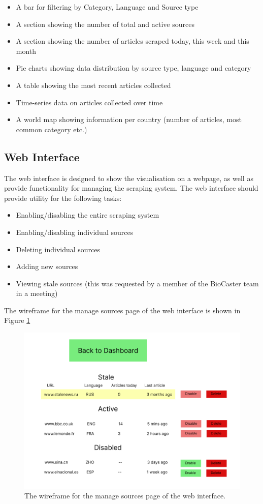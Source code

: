 \documentclass{l4proj}
\begin{document}
\begin{itemize}
    \item A bar for filtering by Category, Language and Source type
    \item A section showing the number of total and active sources
    \item A section showing the number of articles scraped today, this week and this month
    \item Pie charts showing data distribution by source type, language and category
    \item A table showing the most recent articles collected
    \item Time-series data on articles collected over time
    \item A world map showing information per country (number of articles, most common category etc.)
\end{itemize}

\subsection{Web Interface}
The web interface is designed to show the visualisation on a webpage, as well as provide functionality for managing the scraping system. The web interface should provide utility for the following tasks:
\begin{itemize}
    \item Enabling/disabling the entire scraping system
    \item Enabling/disabling individual sources
    \item Deleting individual sources
    \item Adding new sources
    \item Viewing stale sources (this was requested by a member of the BioCaster team in a meeting)
\end{itemize}
The wireframe for the manage sources page of the web interface is shown in Figure \ref{fig:interface-wireframe} 
 \begin{figure}[h]
\centering
\includegraphics[width=\textwidth]{images/interface-wireframe-sources.png}
\caption{The wireframe for the manage sources page of the web interface.}
\label{fig:interface-wireframe}
\end{figure}
\end{document}
